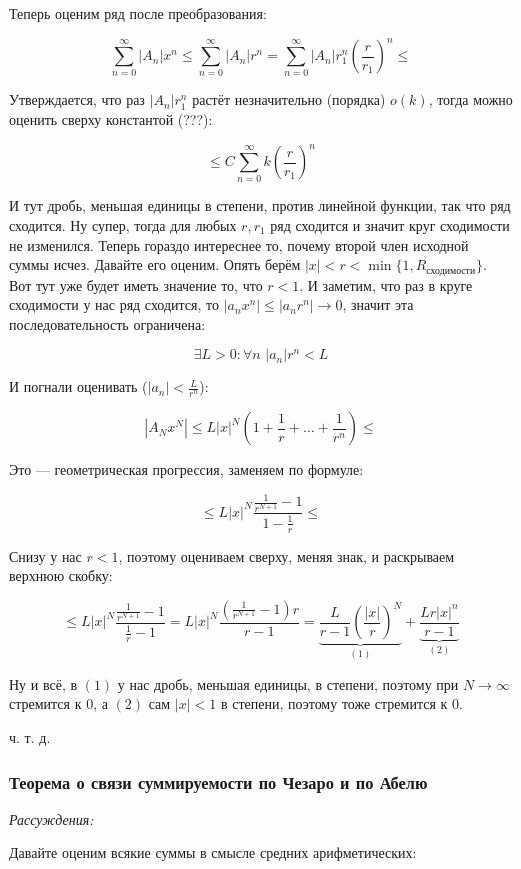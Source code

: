 \documentclass{article}
\def\dbl{\,\,}
\begin{document}
Теперь оценим ряд после преобразования:

\[\sum_{n = 0}^{\infty} |A_n| x^n \le \sum_{n = 0}^{\infty} |A_n| r^n = \sum_{n = 0}^{\infty} |A_n|r^n_{1} \left(\frac{r}{r_{1}}\right)^n \le\]

Утверждается, что раз $|A_n|r^n_1$ растёт незначительно (порядка) $o(k)$, тогда можно оценить сверху константой (???): 

\[\le C \sum_{n = 0}^{\infty}k \left(\frac{r}{r_1}\right)^{n}\]

И тут дробь, меньшая единицы в степени, против линейной функции, так что ряд сходится. Ну супер, тогда для любых $r, r_1$ ряд сходится и значит круг сходимости не изменился. Теперь гораздо интереснее то, почему второй член исходной суммы исчез. Давайте его оценим. Опять берём $|x| < r < \min\{1, R_{\text{сходимости}}\}$. Вот тут уже будет иметь значение то, что $r < 1$. И заметим, что раз в круге сходимости у нас ряд сходится, то $|a_nx^n| \le |a_nr^n| \rightarrow 0$, значит эта последовательность ограничена:

\[\exists L > 0: \forall n \dbl |a_n|r^n < L\]

И погнали оценивать ($|a_n| < \frac{L}{r^n}$):

\[|A_Nx^N| \le L|x|^N\left(1 + \frac{1}{r} + \ldots + \frac{1}{r^n}\right) \le\]

Это --- геометрическая прогрессия, заменяем по формуле: 

\[\le L|x|^N\frac{\frac{1}{r^{N + 1}} - 1}{1 - \frac{1}{r}} \le\]

Снизу у нас $r < 1$, поэтому оцениваем сверху, меняя знак, и раскрываем верхнюю скобку: 

\[\le L |x|^N\frac{\frac{1}{r^{N + 1}} - 1}{\frac{1}{r} - 1} =  L |x|^N\frac{(\frac{1}{r^{N + 1}} - 1)r}{r - 1} = \underbrace{\frac{L}{r - 1}\left(\frac{|x|}{r}\right)^{N}}_{(1)} + \underbrace{\frac{Lr|x|^n}{r - 1}}_{(2)}\]

Ну и всё, в $(1)$ у нас дробь, меньшая единицы, в степени, поэтому при $N \rightarrow \infty$ стремится к $0$, а $(2)$ сам $|x| < 1$ в степени, поэтому тоже стремится к $0$.

ч. т. д. 

\subsubsection{Теорема о связи суммируемости по Чезаро и по Абелю}

\textit{Рассуждения:}

Давайте оценим всякие суммы в смысле средних арифметических: 
\end{document}
